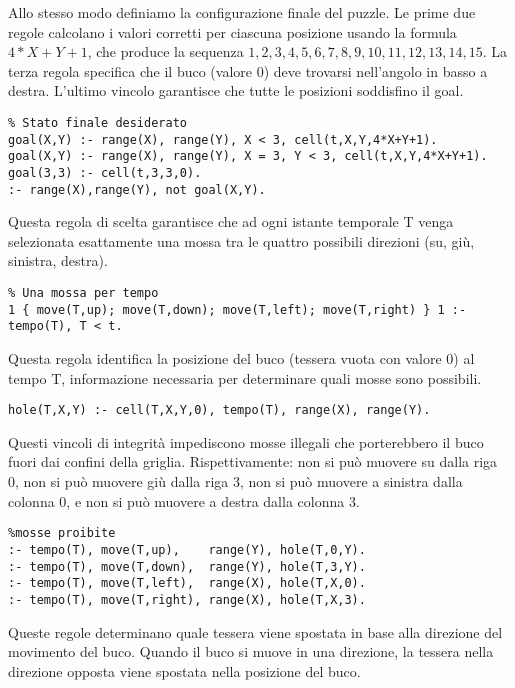 Allo stesso modo definiamo la configurazione finale del puzzle. Le prime due regole calcolano i valori corretti per ciascuna posizione usando la formula $4*X+Y+1$, che produce la sequenza $1,2,3,4,5,6,7,8,9,10,11,12,13,14,15$. La terza regola specifica che il buco (valore $0$) deve trovarsi nell'angolo in basso a destra. L'ultimo vincolo garantisce che tutte le posizioni soddisfino il goal.

\begin{verbatim}
% Stato finale desiderato
goal(X,Y) :- range(X), range(Y), X < 3, cell(t,X,Y,4*X+Y+1).
goal(X,Y) :- range(X), range(Y), X = 3, Y < 3, cell(t,X,Y,4*X+Y+1).
goal(3,3) :- cell(t,3,3,0).
:- range(X),range(Y), not goal(X,Y).
\end{verbatim}

Questa regola di scelta garantisce che ad ogni istante temporale T venga selezionata esattamente una mossa tra le quattro possibili direzioni (su, giù, sinistra, destra).

\begin{verbatim}
% Una mossa per tempo
1 { move(T,up); move(T,down); move(T,left); move(T,right) } 1 :- tempo(T), T < t.
\end{verbatim}

Questa regola identifica la posizione del buco (tessera vuota con valore 0) al tempo T, informazione necessaria per determinare quali mosse sono possibili.

\begin{verbatim}
hole(T,X,Y) :- cell(T,X,Y,0), tempo(T), range(X), range(Y).
\end{verbatim}

Questi vincoli di integrità impediscono mosse illegali che porterebbero il buco fuori dai confini della griglia. Rispettivamente: non si può muovere su dalla riga 0, non si può muovere giù dalla riga 3, non si può muovere a sinistra dalla colonna 0, e non si può muovere a destra dalla colonna 3.

\begin{verbatim}
%mosse proibite
:- tempo(T), move(T,up),    range(Y), hole(T,0,Y). 
:- tempo(T), move(T,down),  range(Y), hole(T,3,Y). 
:- tempo(T), move(T,left),  range(X), hole(T,X,0). 
:- tempo(T), move(T,right), range(X), hole(T,X,3).
\end{verbatim}

Queste regole determinano quale tessera viene spostata in base alla direzione del movimento del buco. Quando il buco si muove in una direzione, la tessera nella direzione opposta viene spostata nella posizione del buco.

